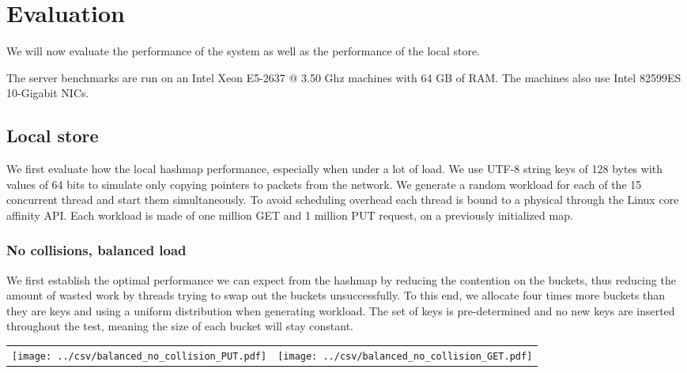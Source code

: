 \documentclass[11pt]{book}
\begin{document}
\chapter{Evaluation}
\label{chap:evaluation}

We will now evaluate the performance of the system as well as the
performance of the local store.

The server benchmarks are run on an Intel Xeon E5-2637 @ 3.50 Ghz
machines with 64 GB of RAM\@. The machines also use Intel 82599ES
10-Gigabit NICs.


\section{Local store}
\label{sec:eval-local}

We first evaluate how the local hashmap performance, especially when
under a lot of load. We use UTF-8 string keys of 128 bytes with values
of 64 bits to simulate only copying pointers to packets from the
network. We generate a random workload for each of the 15 concurrent
thread and start them simultaneously. To avoid scheduling overhead
each thread is bound to a physical through the Linux core affinity
API\@. Each workload is made of one million GET and 1 million PUT
request, on a previously initialized map.

\subsection{No collisions, balanced load}

We first establish the optimal performance we can expect from the
hashmap by reducing the contention on the buckets, thus reducing the
amount of wasted work by threads trying to swap out the buckets
unsuccessfully. To this end, we allocate four times more buckets than
they are keys and using a uniform distribution when generating
workload. The set of keys is pre-determined and no new keys are
inserted throughout the test, meaning the size of each bucket will
stay constant.

\begin{center}
  \begin{tabular}{c c} \label{table:nocol-balanced}
    \texttt{[image: ../csv/balanced\_no\_collision\_PUT.pdf]}
    &
      \texttt{[image: ../csv/balanced\_no\_collision\_GET.pdf]}
  \end{tabular}
\end{center}
\end{document}
